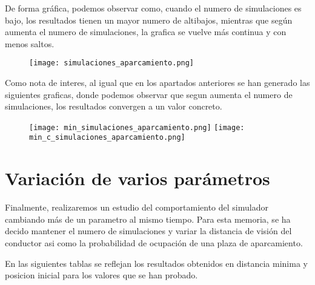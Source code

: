 De forma gráfica, podemos observar como, cuando el numero de simulaciones es bajo, los resultados tienen un mayor numero de altibajos, mientras que según aumenta el numero de simulaciones, la grafica se vuelve más continua y con menos saltos.

\begin{figure}[h]
\texttt{[image: simulaciones\_aparcamiento.png]}
\centering
\end{figure}

\newpage

Como nota de interes, al igual que en los apartados anteriores se han generado las siguientes graficas, donde podemos observar que segun aumenta el numero de simulaciones, los resultados convergen a un valor concreto.

\begin{figure}[h]
\texttt{[image: min\_simulaciones\_aparcamiento.png]}
\texttt{[image: min\_c\_simulaciones\_aparcamiento.png]}
\centering
\end{figure}

\newpage

\section{Variación de varios parámetros}

Finalmente, realizaremos un estudio del comportamiento del simulador cambiando más de un parametro al mismo tiempo. Para esta memoria, se ha decido mantener el numero de simulaciones y variar la distancia de visión del conductor asi como la probabilidad de ocupación de una plaza de aparcamiento.

En las siguientes tablas se reflejan los resultados obtenidos en distancia minima y posicion inicial para los valores que se han probado.

